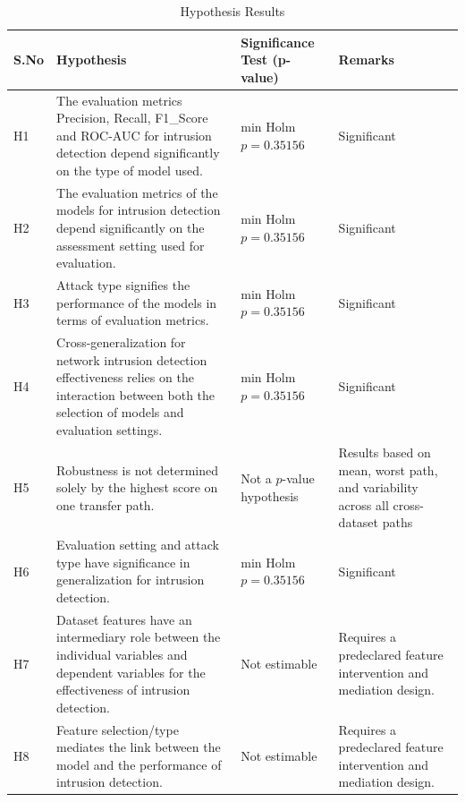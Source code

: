 \begin{table}[!ht]
    \centering
    \caption{Hypothesis Results}
    \label{tab:hypothesis-results}
    {\fontsize{9}{11}\selectfont
    \renewcommand{\arraystretch}{1.2}
    \setlength{\tabcolsep}{4pt}
    \begin{tabularx}{\textwidth}{
        >{\raggedright\arraybackslash}p{0.8cm}
        >{\raggedright\arraybackslash}p{8.5cm}
        >{\raggedright\arraybackslash}p{2.2cm}
        >{\raggedright\arraybackslash}X
    }
        \toprule
        \textbf{S.No} & \textbf{Hypothesis} & \textbf{Significance Test (p-value)} & \textbf{Remarks} \\
        \midrule

        H1 & The evaluation metrics Precision, Recall, F1\_Score and ROC-AUC for intrusion detection depend significantly on the type of model used.
        & min Holm $p = 0.35156$
        & Significant \\

        H2 & The evaluation metrics of the models for intrusion detection depend significantly on the assessment setting used for evaluation.
        & min Holm $p = 0.35156$
        & Significant \\

        H3 & Attack type signifies the performance of the models in terms of evaluation metrics.
        & min Holm $p = 0.35156$
        & Significant \\

        H4 & Cross-generalization for network intrusion detection effectiveness relies on the interaction between both the selection of models and evaluation settings.
        & min Holm $p = 0.35156$
        & Significant \\

        H5 & Robustness is not determined solely by the highest score on one transfer path.
        & Not a $p$-value hypothesis
        & Results based on mean, worst path, and variability across all cross-dataset paths \\

        H6 & Evaluation setting and attack type have significance in generalization for intrusion detection.
        & min Holm $p = 0.35156$
        & Significant \\

        H7 & Dataset features have an intermediary role between the individual variables and dependent variables for the effectiveness of intrusion detection.
        & Not estimable
        & Requires a predeclared feature intervention and mediation design. \\

        H8 & Feature selection/type mediates the link between the model and the performance of intrusion detection.
        & Not estimable
        & Requires a predeclared feature intervention and mediation design. \\

        \bottomrule
    \end{tabularx}
    }
\end{table}
\FloatBarrier
\clearpage

